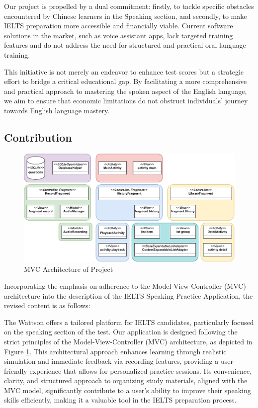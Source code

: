 \documentclass[conference,10pt,letterpaper]{IEEEtran}
\begin{document}
	Our project is propelled by a dual commitment: firstly, to tackle specific obstacles encountered by Chinese learners in the Speaking section, and secondly, to make IELTS preparation more accessible and financially viable. Current software solutions in the market, such as voice assistant apps, lack targeted training features and do not address the need for structured and practical oral language training.
	
	This initiative is not merely an endeavor to enhance test scores but a strategic effort to bridge a critical educational gap. By facilitating a more comprehensive and practical approach to mastering the spoken aspect of the English language, we aim to ensure that economic limitations do not obstruct individuals' journey towards English language mastery.
	
	\subsection{Contribution}
	
	\begin{figure}[ht]
		\centering
		\includegraphics[width=6.2in]{src/all-classes.pdf}
		\caption{MVC Architecture of Project}
		\label{fig:all_classes}
	\end{figure}
	
	Incorporating the emphasis on adherence to the Model-View-Controller (MVC) architecture into the description of the IELTS Speaking Practice Application, the revised content is as follows:
	
	\newpage
	The Wattson offers a tailored platform for IELTS candidates, particularly focused on the speaking section of the test. Our application is designed following the strict principles of the Model-View-Controller (MVC) architecture, as depicted in Figure \ref{fig:all_classes}. This architectural approach enhances learning through realistic simulation and immediate feedback via recording features, providing a user-friendly experience that allows for personalized practice sessions. Its convenience, clarity, and structured approach to organizing study materials, aligned with the MVC model, significantly contribute to a user's ability to improve their speaking skills efficiently, making it a valuable tool in the IELTS preparation process.
	
\end{document}
